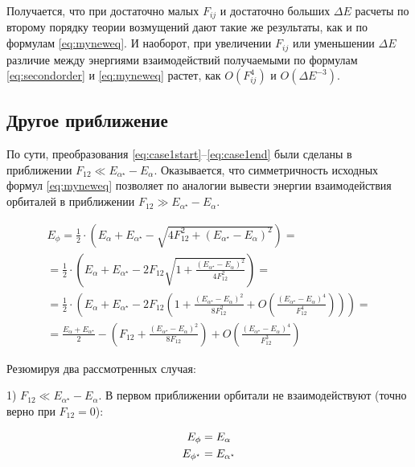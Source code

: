 \documentclass{article}
\begin{document}
Получается, что при достаточно малых $F_{ij}$ и достаточно больших $\Delta E$ расчеты по второму порядку теории возмущений дают такие же результаты, как и по формулам \eqref{eq:myneweq}. И наоборот, при увеличении $F_{ij}$ или уменьшении $\Delta E$ различие между энергиями взаимодействий получаемыми по формулам \eqref{eq:secondorder} и \eqref{eq:myneweq} растет, как $O(F_{ij}^4)$ и $O(\Delta E ^ {-3})$.

\subsection{Другое приближение}

По сути, преобразования \eqref{eq:case1start}--\eqref{eq:case1end} были сделаны в приближении $F_{12} \ll E_{\alpha^{\star}} - E_{\alpha}$. Оказывается, что симметричность исходных формул \eqref{eq:myneweq} позволяет по аналогии вывести энергии взаимодействия орбиталей в приближении $F_{12} \gg E_{\alpha^{\star}} - E_{\alpha}$.

\begin{gather} \label{eq:case2start}
    E_{\phi} = \frac{1}{2} \cdot \left( E_{\alpha} + E_{\alpha^{\star}} - \sqrt{4F_{12}^2 + \left( E_{\alpha^{\star}} - E_{\alpha}\right)^2 } \right) =  \\ 
    = \frac{1}{2} \cdot \left( E_{\alpha} + E_{\alpha^{\star}} - 2 F_{12} \sqrt{ 1 + \frac{\left( E_{\alpha^{\star}} - E_{\alpha}\right)^2}{4 F_{12}^2} } \right) = \\
    = \frac{1}{2} \cdot \left( E_{\alpha} + E_{\alpha^{\star}} - 2 F_{12} \left( 1 + \frac{\left( E_{\alpha^{\star}} - E_{\alpha}\right)^2}{8 F_{12}^2} + O\left(  \frac{\left( E_{\alpha^{\star}} - E_{\alpha}\right)^4}{F_{12}^4} \right)  \right) \right) = \\
    = \frac{E_{\alpha} + E_{\alpha^{\star}}}{2} - \left( F_{12} + \frac{\left( E_{\alpha^{\star}} - E_{\alpha}\right)^2}{8 F_{12}} \right) + O\left( \frac{\left( E_{\alpha^{\star}} - E_{\alpha}\right)^4}{F_{12}^3} \right)
    \label{eq:case2end}
\end{gather} 

Резюмируя два рассмотренных случая:

1) $F_{12} \ll E_{\alpha^{\star}} - E_{\alpha}$. В первом приближении орбитали не взаимодействуют (точно верно при $F_{12} = 0$):

\begin{gather} 
    E_{\phi} = E_{\alpha} \notag\\
    E_{\phi^{\star}} = E_{\alpha^{\star}}
\end{gather}
\end{document}
